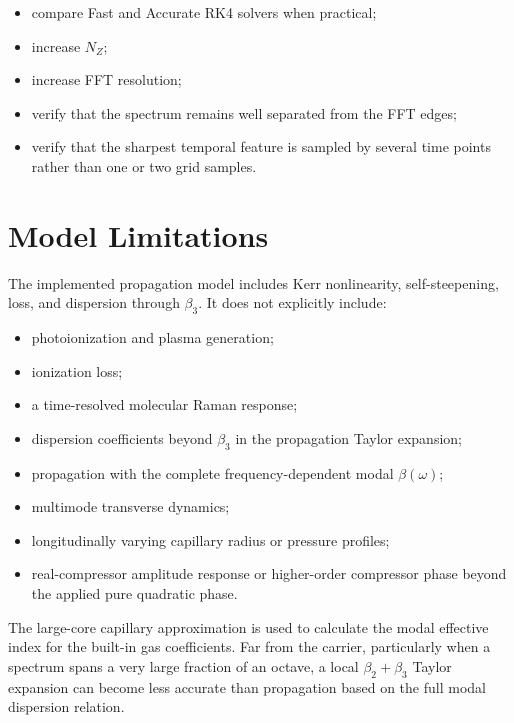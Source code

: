 \documentclass[11pt,a4paper]{article}
\begin{document}
\begin{itemize}
    \item compare Fast and Accurate RK4 solvers when practical;
    \item increase $N_Z$;
    \item increase FFT resolution;
    \item verify that the spectrum remains well separated from the FFT edges;
    \item verify that the sharpest temporal feature is sampled by several time
    points rather than one or two grid samples.
\end{itemize}

\section{Model Limitations}

The implemented propagation model includes Kerr nonlinearity, self-steepening,
loss, and dispersion through $\beta_3$. It does not explicitly include:

\begin{itemize}
    \item photoionization and plasma generation;
    \item ionization loss;
    \item a time-resolved molecular Raman response;
    \item dispersion coefficients beyond $\beta_3$ in the propagation Taylor
    expansion;
    \item propagation with the complete frequency-dependent modal
    $\beta(\omega)$;
    \item multimode transverse dynamics;
    \item longitudinally varying capillary radius or pressure profiles;
    \item real-compressor amplitude response or higher-order compressor phase
    beyond the applied pure quadratic phase.
\end{itemize}

The large-core capillary approximation is used to calculate the modal effective
index for the built-in gas coefficients. Far from the carrier, particularly
when a spectrum spans a very large fraction of an octave, a local
$\beta_2+\beta_3$ Taylor expansion can become less accurate than propagation
based on the full modal dispersion relation.
\end{document}
